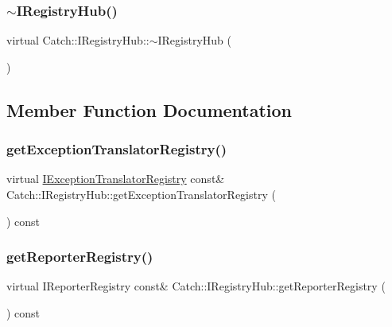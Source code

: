 \subsubsection{\texorpdfstring{$\sim$\+I\+Registry\+Hub()}{~IRegistryHub()}}
{\footnotesize\ttfamily virtual Catch\+::\+I\+Registry\+Hub\+::$\sim$\+I\+Registry\+Hub (\begin{DoxyParamCaption}{ }\end{DoxyParamCaption})\hspace{0.3cm}{\ttfamily [virtual]}}



\subsection{Member Function Documentation}
\mbox{\label{struct_catch_1_1_i_registry_hub_a48347c170d9c583af73027a27b2f0bd4}} 
\subsubsection{\texorpdfstring{get\+Exception\+Translator\+Registry()}{getExceptionTranslatorRegistry()}}
{\footnotesize\ttfamily virtual \mbox{\hyperlink{struct_catch_1_1_i_exception_translator_registry}{I\+Exception\+Translator\+Registry}} const\& Catch\+::\+I\+Registry\+Hub\+::get\+Exception\+Translator\+Registry (\begin{DoxyParamCaption}{ }\end{DoxyParamCaption}) const\hspace{0.3cm}{\ttfamily [pure virtual]}}

\mbox{\label{struct_catch_1_1_i_registry_hub_a55534563f7ecf7e20ec1e37285ebe54d}} 
\subsubsection{\texorpdfstring{get\+Reporter\+Registry()}{getReporterRegistry()}}
{\footnotesize\ttfamily virtual I\+Reporter\+Registry const\& Catch\+::\+I\+Registry\+Hub\+::get\+Reporter\+Registry (\begin{DoxyParamCaption}{ }\end{DoxyParamCaption}) const\hspace{0.3cm}{\ttfamily [pure virtual]}}


